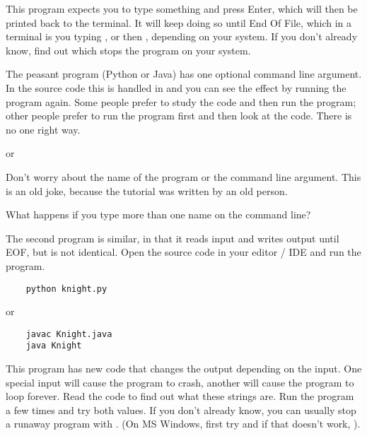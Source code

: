 This program expects you to type something and press Enter, which will then be printed
back to the terminal. It will keep doing so until End Of File, which in a terminal is
you typing , or  then , depending on your system.
If you don't already know, find out which stops the program on your system.

The peasant program (Python or Java) has one optional command line argument.
In the source code this is handled in  and you can see the effect
by running the program again. Some people prefer to study the code and then run the
program; other people prefer to run the program first and then look at the code.
There is no one right way.

or

\begin{IMPORTANT}
Don't worry about the name of the program or the command line argument. This is an
old joke, because the tutorial was written by an old person.
\end{IMPORTANT}

What happens if you type more than one name on the command line?



The second program is similar, in that it reads input and writes output until EOF,
but is not identical. Open the source code in your editor / IDE and run the program.

\begin{CODE}\begin{verbatim}
    python knight.py
\end{verbatim}\end{CODE}
or
\begin{CODE}\begin{verbatim}
    javac Knight.java
    java Knight
\end{verbatim}\end{CODE}

This program has new  code that changes the output depending
on the input. One special input will cause the program to crash, another will
cause the program to loop forever. Read the code to find out what these strings
are. Run the program a few times and try both values. If you don't already know,
you can usually stop a runaway program with . (On MS Windows, first
try  and if that doesn't work, ).


